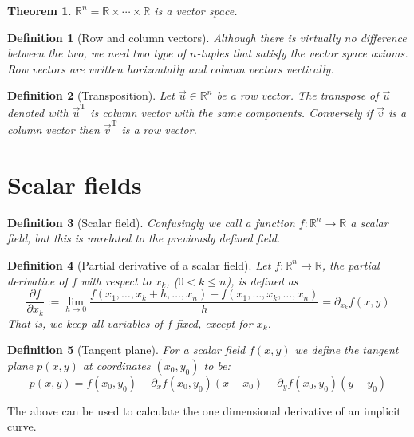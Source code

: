 \documentclass[twocolumn, margin=normal]{tex/hsrzf}
\newcommand\Rset{\mathbb{R}}
\newcommand\T{\mathrm{T}}
\theoremstyle{fuvarzf}
\newtheorem{theorem}{Theorem}
\newtheorem{definition}{Definition}
\begin{document}
\begin{theorem}
  \(\Rset^n = \Rset\times\cdots\times\Rset\) is a vector space.
\end{theorem}

\begin{definition}[Row and column vectors]
  Although there is virtually no difference between the two, we need two type
  of \(n\)-tuples that satisfy the vector space axioms. \emph{Row} vectors are
  written horizontally and \emph{column} vectors vertically.
\end{definition}

\begin{definition}[Transposition]
  Let \(\vec{u} \in \Rset^n\) be a row vector. The \emph{transpose} of
  \(\vec{u}\) denoted with \(\vec{u}^\T\) is column vector with the same
  components. Conversely if \(\vec{v}\) is a column vector then \(\vec{v}^\T\)
  is a row vector.
\end{definition}

\section{Scalar fields}

\begin{definition}[Scalar field]
  Confusingly we call a function \(f: \Rset^n \to \Rset\) a \emph{scalar
  field}, but this is unrelated to the previously defined field.
\end{definition}

\begin{definition}[Partial derivative of a scalar field]
  Let \(f: \Rset^n \to \Rset\), the \emph{partial} derivative of \(f\) with
  respect to \(x_k\), (\(0 < k \leq n\)), is defined as
  \[
    \frac{\partial f}{\partial x_k} :=
    \lim_{h \to 0} \frac{f(x_1, \dots, x_k + h, \dots, x_n) 
      - f(x_1, \dots, x_k, \dots, x_n)}{h}
    = \partial_{x_k} f(x, y)
  \]
  That is, we keep all variables of \(f\) fixed, except for \(x_k\).
\end{definition}

\begin{definition}[Tangent plane]
  For a scalar field \(f(x,y)\) we define the \emph{tangent plane} \(p(x,y)\)
  at coordinates \((x_0, y_0)\) to be:
  \[
    p(x, y) =
      f(x_0, y_0)
      + \partial_x f(x_0, y_0) (x - x_0)
      + \partial_y f(x_0, y_0) (y - y_0)
  \]
\end{definition}

The above can be used to calculate the one dimensional derivative of an implicit curve.
\end{document}
